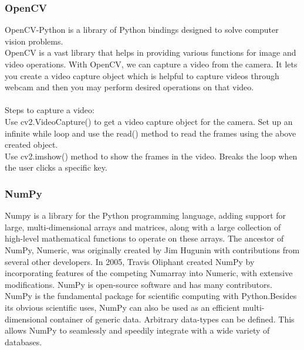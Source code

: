 \subsubsection{OpenCV}
OpenCV-Python is a library of Python bindings designed to solve computer vision problems.\\
OpenCV is a vast library that helps in providing various functions for image and video operations. With OpenCV, we can capture a video from the camera. It lets you create a video capture object which is helpful to capture videos through webcam and then you may perform desired operations on that video.\\\\
Steps to capture a video:\\
Use cv2.VideoCapture() to get a video capture object for the camera.
Set up an infinite while loop and use the read() method to read the frames using the above created object.\\
Use cv2.imshow() method to show the frames in the video.
Breaks the loop when the user clicks a specific key.

\subsubsection{NumPy}
Numpy is a library for the Python programming language, adding support for large, multi-dimensional arrays and matrices, along with a large collection of high-level mathematical functions to operate on these arrays. The ancestor of NumPy, Numeric, was originally created by Jim Hugunin with contributions from several other developers. In 2005, Travis Oliphant created NumPy by incorporating features of the competing Numarray into Numeric, with extensive modifications. NumPy is open-source software and has many contributors.\\
NumPy is the fundamental package for scientific computing with Python.Besides its obvious scientific uses, NumPy can also be used as an efficient multi-dimensional container of generic data. Arbitrary data-types can be defined. This allows NumPy to seamlessly and speedily integrate with a wide variety of databases.

